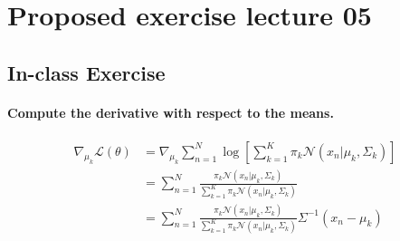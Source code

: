 \documentclass{article}
\newcommand{\1}{\mathbf{1}}
\begin{document}
\section{Proposed exercise lecture 05}
\subsection{In-class Exercise}
\paragraph{Compute the derivative with respect to the means.}
\begin{align*}
  \nabla_{\mu_k}\mathcal{L}(\theta)
   & =
  \nabla_{\mu_k} \sum_{n=1}^N \log \left[ \sum_{k=1}^K \pi_k \mathcal{N}(x_n|\mu_k, \Sigma_k)\right]                   \\
   & =
  \sum_{n=1}^N \frac{\pi_k \mathcal{N}(x_n|\mu_k, \Sigma_k)}{\sum_{k=1}^K \pi_k \mathcal{N}(x_n|\mu_k, \Sigma_k)} \\
   & =
  \sum_{n=1}^N \frac{\pi_k \mathcal{N}(x_n|\mu_k, \Sigma_k)}{\sum_{k=1}^K \pi_k \mathcal{N}(x_n|\mu_k, \Sigma_k)} \Sigma^{-1} (x_n - \mu_k)\\
\end{align*}
\end{document}
